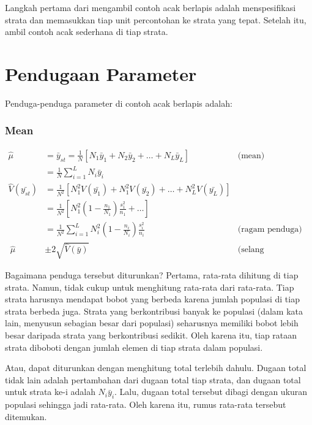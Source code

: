\documentclass[
  letterpaper,
  DIV=11,
  numbers=noendperiod]{scrreprt}
\begin{document}
Langkah pertama dari mengambil contoh acak berlapis adalah
menspesifikasi strata dan memasukkan tiap unit percontohan ke strata
yang tepat. Setelah itu, ambil contoh acak sederhana di tiap strata.

\hypertarget{pendugaan-parameter}{%
\section{Pendugaan Parameter}\label{pendugaan-parameter}}

Penduga-penduga parameter di contoh acak berlapis adalah:

\hypertarget{mean-3}{%
\subsubsection{Mean}\label{mean-3}}

\[
\begin{aligned}
\hat{\mu}&=\bar{y}_{st}=\frac{1}{N}[N_1\bar{y}_1+N_2\bar{y}_2+\ldots+N_L\bar{y}_L]& \text{(mean)}\\
&=\frac{1}{N}\sum_{i=1}^L N_i\bar{y}_i\\
\hat{V}(\bar{y_{st}})&=\frac{1}{N^2}\left[N_1^2 V(\bar{y_1})+N_1^2 V(\bar{y_2})+\ldots+N_L^2 V(\bar{y_L})\right]\\
&=\frac{1}{N^2}\left[N_1^2\left(1-\frac{n_1}{N_1}\right)\frac{s_1^2}{n_1}+\ldots\right]\\
&=\frac{1}{N^2}\sum_{i=1}^L N_i^2\left(1-\frac{n_i}{N_i}\right)\frac{s_i^2}{n_i}&\text{(ragam penduga)}\\\
\hat{\mu}&\pm2\sqrt{\hat{V}(\bar{y})} & \text{(selang kepercayaan)}
\end{aligned}
\]

Bagaimana penduga tersebut diturunkan? Pertama, rata-rata dihitung di
tiap strata. Namun, tidak cukup untuk menghitung rata-rata dari
rata-rata. Tiap strata harusnya mendapat bobot yang berbeda karena
jumlah populasi di tiap strata berbeda juga. Strata yang berkontribusi
banyak ke populasi (dalam kata lain, menyusun sebagian besar dari
populasi) seharusnya memiliki bobot lebih besar daripada strata yang
berkontribusi sedikit. Oleh karena itu, tiap rataan strata diboboti
dengan jumlah elemen di tiap strata dalam populasi.

Atau, dapat diturunkan dengan menghitung total terlebih dahulu. Dugaan
total tidak lain adalah pertambahan dari dugaan total tiap strata, dan
dugaan total untuk strata ke-i adalah \(N_i\bar{y}_i\). Lalu, dugaan
total tersebut dibagi dengan ukuran populasi sehingga jadi rata-rata.
Oleh karena itu, rumus rata-rata tersebut ditemukan.
\end{document}
